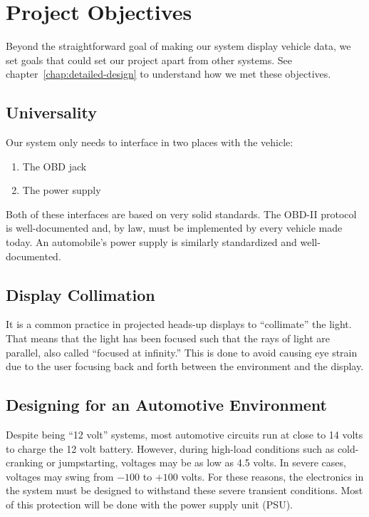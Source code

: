 \chapter{Project Objectives}



Beyond the straightforward goal of making our system display vehicle data, we
set goals that could set our project apart from other systems. See
chapter~\ref{chap:detailed-design} to understand how we met these objectives.

\section{Universality}

Our system only needs to interface in two places with the vehicle:

\begin{enumerate}

\item The OBD jack
\item The power supply

\end{enumerate}

Both of these interfaces are based on very solid standards. The OBD-II protocol
is well-documented and, by law, must be implemented by every vehicle made
today. An automobile's power supply is similarly standardized and
well-documented.

\section{Display Collimation}

It is a common practice in projected heads-up displays to ``collimate'' the
light. That means that the light has been focused such that the rays of light
are parallel, also called ``focused at infinity.'' This is done to avoid
causing eye strain due to the user focusing back and forth between the
environment and the display.

\section{Designing for an Automotive Environment}

Despite being ``12 volt'' systems, most automotive circuits run at close to 
14 volts to charge the 12 volt battery. However, during high-load conditions 
such as cold-cranking or jumpstarting, voltages may be as low as 4.5 volts.  
In severe cases, voltages may swing from $-100$ to $+100$ volts. For these 
reasons, the electronics in the system must be designed to withstand these severe
transient conditions. Most of this protection will be done with the power supply
unit (PSU).
